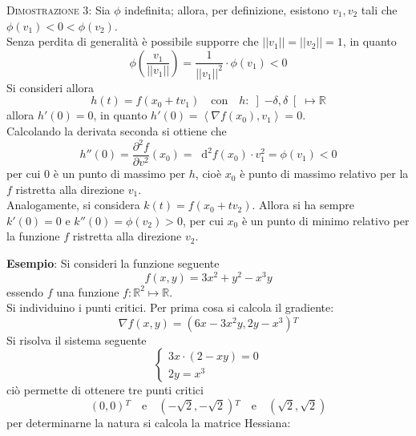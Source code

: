 \documentclass[a4paper]{extarticle}
\newcommand*\dif{\mathop{}\!\mathrm{d}}
\begin{document}
\vspace{2em}
\noindent
\normalfont \normalsize
\textsc{Dimostrazione 3}: Sia $\phi$ indefinita; allora, per definizione, esistono $v_1,v_2$ tali che $\phi(v_1) < 0 < \phi(v_2)$.\\
Senza perdita di generalità è possibile supporre che $\vert \vert v_1 \vert \vert = \vert \vert v_2 \vert \vert = 1$, in quanto
\[\phi \left(\dfrac{v_1}{\vert \vert v_1 \vert \vert}\right) = \dfrac{1}{\vert \vert v_1 \vert \vert^2} \cdot \phi(v_1) < 0\]
Si consideri allora
\[h(t) = f(x_0 + tv_1) \hspace{1em} \text{con} \hspace{1em} h : \left]-\delta,\delta\right[ \longmapsto \mathbb{R}\]
allora $h'(0) = 0$, in quanto $h'(0) = \left<\nabla f(x_0),v_1\right> = 0$.\\
Calcolando la derivata seconda si ottiene che
\[h''(0) = \dfrac{\partial^2 f}{\partial v^2} (x_0) = \dif^2 f(x_0) \cdot v_1^2 = \phi(v_1) < 0\]
per cui $0$ è un punto di massimo per $h$, cioè $x_0$ è punto di massimo relativo per la $f$ ristretta alla direzione $v_1$.\\
Analogamente, si considera $k(t) = f(x_0+tv_2)$. Allora si ha sempre $k'(0)=0$ e $k''(0) = \phi(v_2) > 0$, per cui $x_0$ è un punto di minimo relativo per la funzione $f$ ristretta alla direzione $v_2$.

\vspace{2em}
\noindent
\textbf{Esempio}: Si consideri la funzione seguente
\[f(x,y) = 3x^2+y^2-x^3y\]
essendo $f$ una funzione $f : \mathbb{R}^2 \longmapsto \mathbb{R}$.\\
Si individuino i punti critici. Per prima cosa si calcola il gradiente:
\[\nabla f(x,y) = \left(6x - 3x^2 y, 2y - x^3\right){^T}\]
Si risolva il sistema seguente
\[
    \left\{
    \begin{array}{l}
        3x \cdot (2-xy) = 0\\
        2y = x^3
    \end{array}
    \right.
\]
ciò permette di ottenere tre punti critici
\[(0,0){^T} \hspace{1em} \text{e} \hspace{1em} (-\sqrt{2},-\sqrt{2}){^T} \hspace{1em} \text{e} \hspace{1em} (\sqrt{2},\sqrt{2})\]
per determinarne la natura si calcola la matrice Hessiana:
\end{document}
